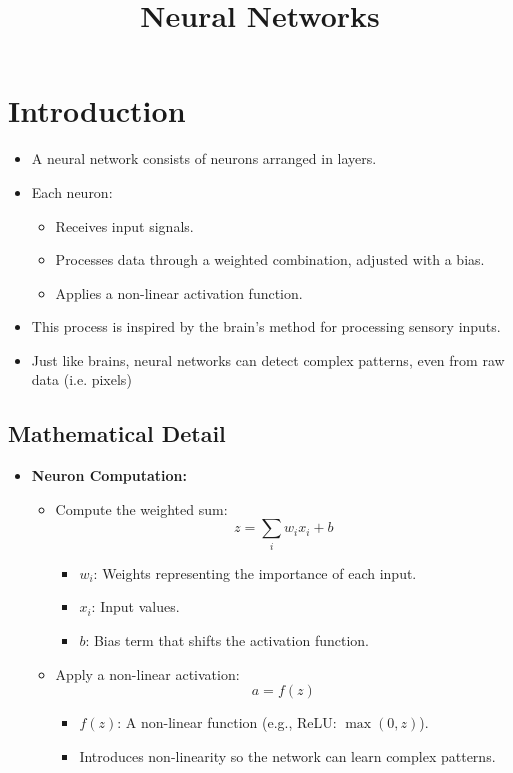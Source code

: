 \documentclass{article}
\title{Neural Networks}
\author{}
\date{}
\begin{document}
\maketitle

\section{Introduction}

\begin{itemize}
    \item A neural network consists of neurons arranged in layers.
    \item Each neuron:
    \begin{itemize}
        \item Receives input signals.
        \item Processes data through a weighted combination, adjusted with a bias.
        \item Applies a non-linear activation function.
    \end{itemize}
    \item This process is inspired by the brain's method for processing sensory inputs.
    \item Just like brains, neural networks can detect complex patterns, even from raw data (i.e. pixels)
\end{itemize}

\subsection{Mathematical Detail}

\begin{itemize}
    \item \textbf{Neuron Computation:}
    \begin{itemize}
        \item Compute the weighted sum:
        \[
        z = \sum_{i} w_i x_i + b
        \]
        \begin{itemize}
            \item \(w_i\): Weights representing the importance of each input.
            \item \(x_i\): Input values.
            \item \(b\): Bias term that shifts the activation function.
        \end{itemize}
        \item Apply a non-linear activation:
        \[
        a = f(z)
        \]
        \begin{itemize}
            \item \(f(z)\): A non-linear function (e.g., ReLU: \(\max(0, z)\)).
            \item Introduces non-linearity so the network can learn complex patterns.
        \end{itemize}
    \end{itemize}
\end{itemize}
\end{document}

